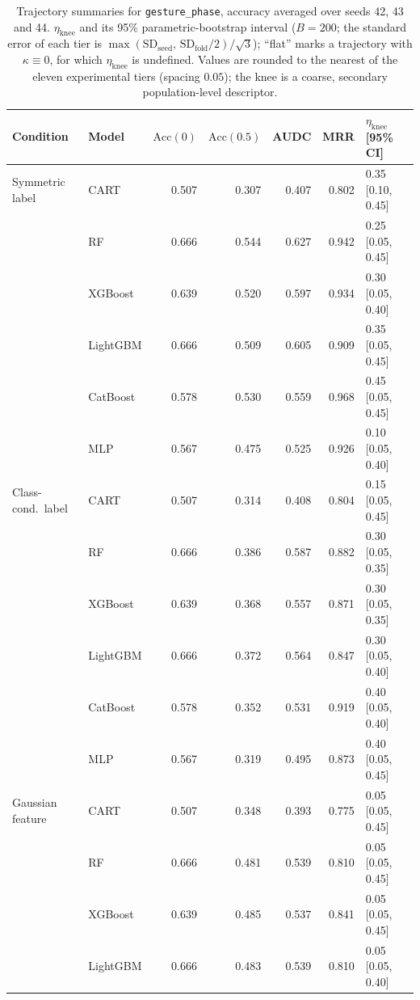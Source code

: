 \documentclass[pdflatex,sn-mathphys]{sn-jnl}
\theoremstyle{thmstyleone}
\begin{document}
\begin{table}[htbp]
\centering
\scriptsize
\setlength{\tabcolsep}{3.5pt}
\caption{Trajectory summaries for \texttt{gesture\_phase}, accuracy averaged over seeds 42, 43 and 44. $\eta_{\mathrm{knee}}$ and its 95\% parametric-bootstrap interval ($B=200$; the standard error of each tier is $\max(\mathrm{SD}_{\mathrm{seed}},\,\mathrm{SD}_{\mathrm{fold}}/2)/\sqrt3$); ``flat'' marks a trajectory with $\kappa\equiv 0$, for which $\eta_{\mathrm{knee}}$ is undefined. Values are rounded to the nearest of the eleven experimental tiers (spacing $0.05$); the knee is a coarse, secondary population-level descriptor.}
\label{tab:traj_gesture_phase}
\begin{tabular}{@{}llrrrrl@{}}
\toprule
Condition & Model & $\mathrm{Acc}(0)$ & $\mathrm{Acc}(0.5)$ & AUDC & MRR & $\eta_{\mathrm{knee}}$ [95\% CI] \\
\midrule
Symmetric label & CART & 0.507 & 0.307 & 0.407 & 0.802 & 0.35 [0.10, 0.45] \\
 & RF & 0.666 & 0.544 & 0.627 & 0.942 & 0.25 [0.05, 0.45] \\
 & XGBoost & 0.639 & 0.520 & 0.597 & 0.934 & 0.30 [0.05, 0.40] \\
 & LightGBM & 0.666 & 0.509 & 0.605 & 0.909 & 0.35 [0.05, 0.45] \\
 & CatBoost & 0.578 & 0.530 & 0.559 & 0.968 & 0.45 [0.05, 0.45] \\
 & MLP & 0.567 & 0.475 & 0.525 & 0.926 & 0.10 [0.05, 0.40] \\
\midrule
Class-cond.\ label & CART & 0.507 & 0.314 & 0.408 & 0.804 & 0.15 [0.05, 0.45] \\
 & RF & 0.666 & 0.386 & 0.587 & 0.882 & 0.30 [0.05, 0.35] \\
 & XGBoost & 0.639 & 0.368 & 0.557 & 0.871 & 0.30 [0.05, 0.35] \\
 & LightGBM & 0.666 & 0.372 & 0.564 & 0.847 & 0.30 [0.05, 0.40] \\
 & CatBoost & 0.578 & 0.352 & 0.531 & 0.919 & 0.40 [0.05, 0.40] \\
 & MLP & 0.567 & 0.319 & 0.495 & 0.873 & 0.40 [0.05, 0.45] \\
\midrule
Gaussian feature & CART & 0.507 & 0.348 & 0.393 & 0.775 & 0.05 [0.05, 0.45] \\
 & RF & 0.666 & 0.481 & 0.539 & 0.810 & 0.05 [0.05, 0.45] \\
 & XGBoost & 0.639 & 0.485 & 0.537 & 0.841 & 0.05 [0.05, 0.45] \\
 & LightGBM & 0.666 & 0.483 & 0.539 & 0.810 & 0.05 [0.05, 0.40] \\

\end{tabular}
\end{table}
\end{document}
